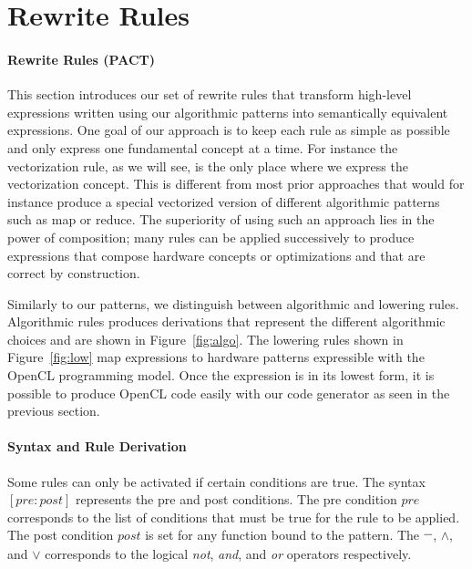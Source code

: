 \section{Rewrite Rules}

\paragraph{Rewrite Rules (PACT)}

This section introduces our set of rewrite rules that transform high-level expressions written using our algorithmic patterns into semantically equivalent expressions.
One goal of our approach is to keep each rule as simple as possible and only express one fundamental concept at a time.
For instance the vectorization rule, as we will see, is the only place where we express the vectorization concept.
This is different from most prior approaches that would for instance produce a special vectorized version of different algorithmic patterns such as map or reduce.
The superiority of using such an approach lies in the power of composition;
many rules can be applied successively to produce expressions that compose hardware concepts or optimizations and that are correct by construction.

Similarly to our patterns, we distinguish between algorithmic and lowering rules.
Algorithmic rules produces derivations that represent the different algorithmic choices and are shown in Figure~\ref{fig:algo}.
The lowering rules shown in Figure~\ref{fig:low} map expressions to hardware patterns expressible with the OpenCL programming model.
Once the expression is in its lowest form, it is possible to produce OpenCL code easily with our code generator as seen in the previous section.


\paragraph{Syntax and Rule Derivation}
Some rules can only be activated if certain conditions are true.
The syntax $[pre:post]$ represents the pre and post conditions.
The pre condition $pre$ corresponds to the list of conditions that must be true for the rule to be applied.
The post condition $post$ is set for any function bound to the pattern.
The $\overline{\rule[-.3\baselineskip]{0pt}{1.5ex}\hspace{1.5ex}}$, $\wedge$, and $\vee$ corresponds to the logical \emph{not}, \emph{and}, and \emph{or} operators respectively.

